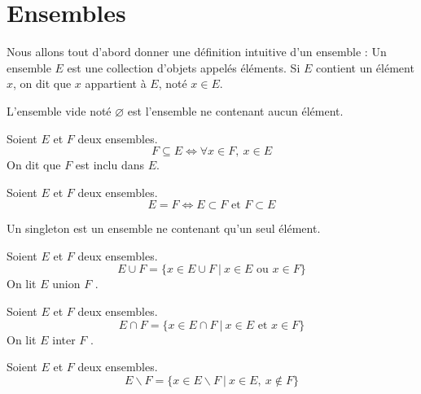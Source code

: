 \chapter{Ensembles}
\def\arraystretch{1}

Nous allons tout d'abord donner une définition intuitive d'un ensemble : Un ensemble $E$ est une collection d'objets appelés éléments. Si $E$ contient un élément $x$, on dit que $x$ appartient à $E$, noté $x \in E$.

\begin{definition}
  L'ensemble vide noté $\varnothing$ est l'ensemble ne contenant aucun élément.
\end{definition}

\begin{definition}[Inclusion]
  Soient $E$ et $F$ deux ensembles.
  $$F \subseteq E \iff \forall x \in F,\ x \in E$$
  On dit que $F$ est inclu dans $E$.
\end{definition}

\begin{definition}
  Soient $E$ et $F$ deux ensembles.
  $$E = F \iff E \subset F \text{ et } F \subset E$$
\end{definition}

\begin{definition}[Singleton]
  Un singleton est un ensemble ne contenant qu'un seul élément.
\end{definition}

\begin{definition}
  Soient $E$ et $F$ deux ensembles.
  \[ E \cup F = \{ x \in E \cup F \ | \ x \in E \text{ ou } x \in F \} \]
  On lit \og $E$ union $F$ \fg.
\end{definition}

\begin{definition}
  Soient $E$ et $F$ deux ensembles.
  \[ E \cap F = \{ x \in E \cap F \ | \ x \in E \text{ et } x \in F \} \]
  On lit \og $E$ inter $F$ \fg.
\end{definition}

\begin{definition}
  Soient $E$ et $F$ deux ensembles.
  \[ E \backslash F = \{ x \in E \backslash F \ | \ x \in E,\ x \notin F \} \]
\end{definition}

